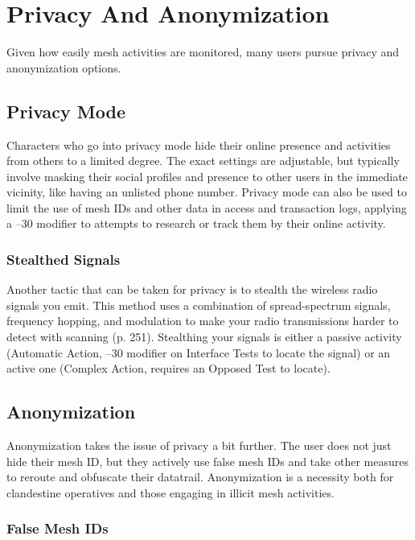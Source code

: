 \section{Privacy And Anonymization}

Given how easily mesh activities are monitored, many 
users pursue privacy and anonymization options.

\subsection{Privacy Mode}

Characters who go into privacy mode hide their online 
presence and activities from others to a limited degree. 
The exact settings are adjustable, but typically involve 
masking their social profiles and presence to other 
users in the immediate vicinity, like having an unlisted 
phone number. Privacy mode can also be used to limit 
the use of mesh IDs and other data in access and 
transaction logs, applying a –30 modifier to attempts 
to research or track them by their online activity.

\subsubsection{Stealthed Signals}

Another tactic that can be taken for privacy is to stealth 
the wireless radio signals you emit. This method uses 
a combination of spread-spectrum signals, frequency 
hopping, and modulation to make your radio transmissions
harder to detect with scanning (p. 251). Stealthing
your signals is either a passive activity (Automatic
Action, –30 modifier on Interface Tests to locate the 
signal) or an active one (Complex Action, requires an 
Opposed Test to locate).

\subsection{Anonymization}

Anonymization takes the issue of privacy a bit further. 
The user does not just hide their mesh ID, but they 
actively use false mesh IDs and take other measures to 
reroute and obfuscate their datatrail. Anonymization 
is a necessity both for clandestine operatives and those 
engaging in illicit mesh activities.

\subsubsection{False Mesh IDs}

